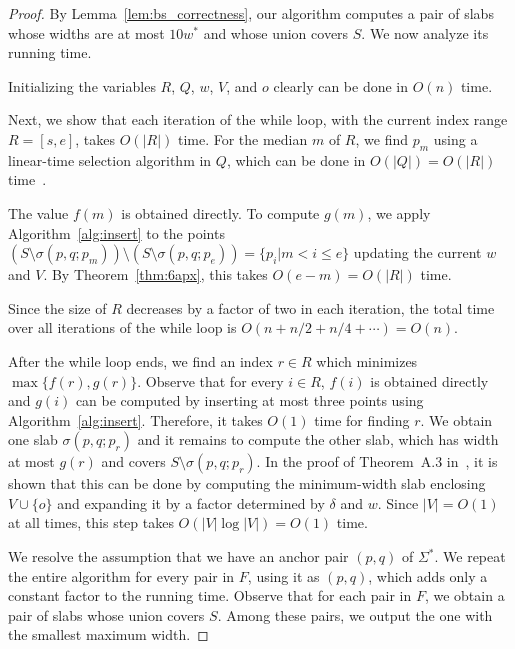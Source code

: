 \documentclass[10pt,a4paper]{article}
\theoremstyle{star}
\theoremstyle{claimstar}
\begin{document}
\begin{proof}
    By Lemma~\ref{lem:bs_correctness}, our algorithm computes a pair of slabs whose widths are at most $10w^*$ and whose union covers $S$.
    We now analyze its running time.

    Initializing the variables $R$, $Q$, $w$, $V$, and $o$ clearly can be done in $O(n)$ time.

    Next, we show that each iteration of the while loop, with the current index range $R = [s, e]$, takes $O(|R|)$ time.
    For the median $m$ of $R$, we find $p_m$ using a linear-time selection algorithm in $Q$, which can be done in $O(|Q|)=O(|R|)$ time~\cite{Blum1973Time_selection}.

    The value $f(m)$ is obtained directly.
    To compute $g(m)$, we apply Algorithm~\ref{alg:insert} to the points $(S\setminus\sigma(p, q; p_m))\setminus (S\setminus\sigma(p, q; p_e))=\{p_i | m < i \le e \}$
    updating the current $w$ and $V$.
    By Theorem~\ref{thm:6apx}, this takes $O(e-m)=O(|R|)$ time.

    Since the size of $R$ decreases by a factor of two in each iteration, the total time over all iterations of the while loop is $O(n + n/2 + n/4 + \cdots) = O(n)$.

    After the while loop ends, we find an index $r\in R$ which minimizes $\max\{f(r), g(r)\}$.
    Observe that for every $i\in R$, $f(i)$ is obtained directly and $g(i)$ can be computed by inserting at most three points using Algorithm~\ref{alg:insert}. 
    Therefore, it takes $O(1)$ time for finding $r$. 
    We obtain one slab $\sigma(p, q;p_r)$ and it remains to compute the other slab, which has width at most $g(r)$ and covers $S \setminus \sigma(p,q;p_r)$.
    In the proof of Theorem~A.3 in~\cite{chan2006faster}, it is shown that this can be done by  computing the minimum-width slab enclosing $V\cup \{ o\}$ and expanding it by a factor determined by $\delta$ and $w$.
    Since $|V|=O(1)$ at all times, this step takes $O(|V|\log |V|)=O(1)$ time.

    We resolve the assumption that we have an anchor pair $(p, q)$ of $\Sigma^*$. We repeat the entire algorithm for every pair in $F$, using it as $(p, q)$, which adds only a constant factor to the running time.
    Observe that for each pair in $F$, we obtain a pair of slabs whose union covers $S$. 
    Among these pairs, we output the one with the smallest maximum width.  
\end{proof}
\end{document}
